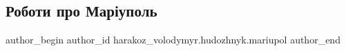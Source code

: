  
 
 
 
 

\subsection{Роботи про Маріуполь}
\label{sec:26_03_2022.fb.harakoz_volodymyr.hudozhnyk.mariupol.1.roboty_pro_mariupol}

\ifcmt
 author_begin
   author_id harakoz_volodymyr.hudozhnyk.mariupol
 author_end
\fi
